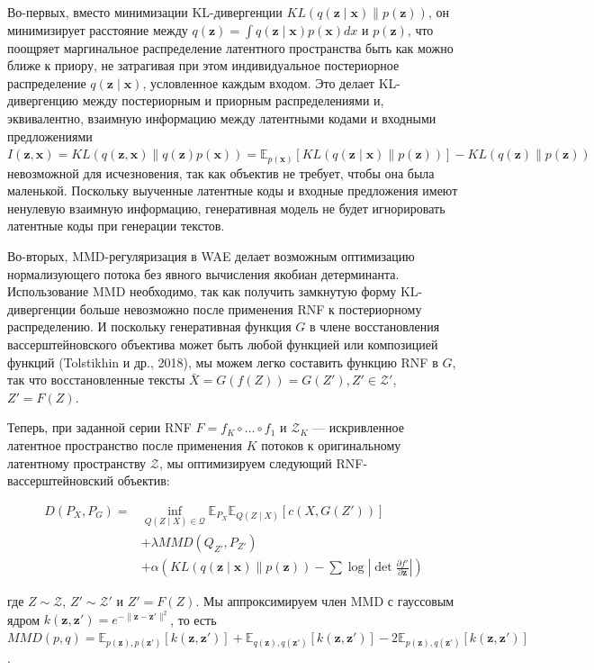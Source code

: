 \documentclass{article}
\begin{document}
Во-первых, вместо минимизации KL-дивергенции \(KL(q(\mathbf{z} \mid \mathbf{x}) \| p(\mathbf{z}))\), он минимизирует расстояние между \(q(\mathbf{z}) = \int q(\mathbf{z} \mid \mathbf{x}) p(\mathbf{x}) dx\) и \(p(\mathbf{z})\), что поощряет маргинальное распределение латентного пространства быть как можно ближе к приору, не затрагивая при этом индивидуальное постериорное распределение \(q(\mathbf{z} \mid \mathbf{x})\), условленное каждым входом. Это делает KL-дивергенцию между постериорным и приорным распределениями и, эквивалентно, взаимную информацию между латентными кодами и входными предложениями \(I(\mathbf{z}, \mathbf{x}) = KL(q(\mathbf{z}, \mathbf{x}) \| q(\mathbf{z}) p(\mathbf{x})) = \mathbb{E}_{p(\mathbf{x})}[KL(q(\mathbf{z} \mid \mathbf{x}) \| p(\mathbf{z}))] - KL(q(\mathbf{z}) \| p(\mathbf{z}))\) невозможной для исчезновения, так как объектив не требует, чтобы она была маленькой. Поскольку выученные латентные коды и входные предложения имеют ненулевую взаимную информацию, генеративная модель не будет игнорировать латентные коды при генерации текстов.

Во-вторых, MMD-регуляризация в WAE делает возможным оптимизацию нормализующего потока без явного вычисления якобиан детерминанта. Использование MMD необходимо, так как получить замкнутую форму KL-дивергенции больше невозможно после применения RNF к постериорному распределению. И поскольку генеративная функция \(G\) в члене восстановления вассерштейновского объектива может быть любой функцией или композицией функций (Tolstikhin и др., 2018), мы можем легко составить функцию RNF в \(G\), так что восстановленные тексты \(\bar{X} = G(f(Z)) = G(Z'), Z' \in \mathcal{Z}'\), \(Z' = F(Z)\).

Теперь, при заданной серии RNF \(F = f_K \circ \ldots \circ f_1\) и \(\mathcal{Z}_K\) — искривленное латентное пространство после применения \(K\) потоков к оригинальному латентному пространству \(\mathcal{Z}\), мы оптимизируем следующий RNF-вассерштейновский объектив:

\[
\begin{aligned}
D(P_X, P_G) = & \inf_{Q(Z \mid X) \in \mathcal{Q}} \mathbb{E}_{P_X} \mathbb{E}_{Q(Z \mid X)}[c(X, G(Z'))] \\
& + \lambda MMD(Q_{Z'}, P_{Z'}) \\
& + \alpha (KL(q(\mathbf{z} \mid \mathbf{x}) \| p(\mathbf{z})) - \sum \log \left| \det \frac{\partial f'}{\partial \mathbf{z}} \right|)
\end{aligned}
\]

где \(Z \sim \mathcal{Z}\), \(Z' \sim \mathcal{Z}'\) и \(Z' = F(Z)\). Мы аппроксимируем член MMD с гауссовым ядром \(k(\mathbf{z}, \mathbf{z}') = e^{-\|\mathbf{z} - \mathbf{z}'\|^2}\), то есть \(MMD(p, q) = \mathbb{E}_{p(\mathbf{z}), p(\mathbf{z}')}[k(\mathbf{z}, \mathbf{z}')] + \mathbb{E}_{q(\mathbf{z}), q(\mathbf{z}')}[k(\mathbf{z}, \mathbf{z}')] - 2 \mathbb{E}_{p(\mathbf{z}), q(\mathbf{z}')}[k(\mathbf{z}, \mathbf{z}')]\).
\end{document}
